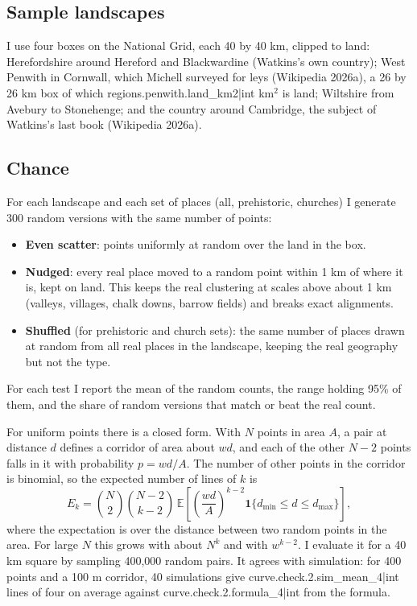 \documentclass[11pt,a4paper]{article}
\begin{document}
\subsection{Sample landscapes}

I use four boxes on the National Grid, each 40 by 40 km, clipped to land: Herefordshire around Hereford and Blackwardine (Watkins's own country); West Penwith in Cornwall, which Michell surveyed for leys (Wikipedia 2026a), a 26 by 26 km box of which {{regions.penwith.land_km2|int}} km$^2$ is land; Wiltshire from Avebury to Stonehenge; and the country around Cambridge, the subject of Watkins's last book (Wikipedia 2026a).

\subsection{Chance}

For each landscape and each set of places (all, prehistoric, churches) I generate 300 random versions with the same number of points:
\begin{itemize}
\item \textbf{Even scatter}: points uniformly at random over the land in the box.
\item \textbf{Nudged}: every real place moved to a random point within 1 km of where it is, kept on land. This keeps the real clustering at scales above about 1 km (valleys, villages, chalk downs, barrow fields) and breaks exact alignments.
\item \textbf{Shuffled} (for prehistoric and church sets): the same number of places drawn at random from all real places in the landscape, keeping the real geography but not the type.
\end{itemize}
For each test I report the mean of the random counts, the range holding 95\% of them, and the share of random versions that match or beat the real count.

For uniform points there is a closed form. With $N$ points in area $A$, a pair at distance $d$ defines a corridor of area about $wd$, and each of the other $N-2$ points falls in it with probability $p = wd/A$. The number of other points in the corridor is binomial, so the expected number of lines of $k$ is
\begin{equation}
E_k = \binom{N}{2}\binom{N-2}{k-2}\,\mathbb{E}\left[\left(\frac{wd}{A}\right)^{k-2}\mathbf{1}\{d_{\min}\le d\le d_{\max}\}\right],
\end{equation}
where the expectation is over the distance between two random points in the area. For large $N$ this grows with about $N^k$ and with $w^{k-2}$. I evaluate it for a 40 km square by sampling 400,000 random pairs. It agrees with simulation: for 400 points and a 100 m corridor, 40 simulations give {{curve.check.2.sim_mean_4|int}} lines of four on average against {{curve.check.2.formula_4|int}} from the formula.
\end{document}
